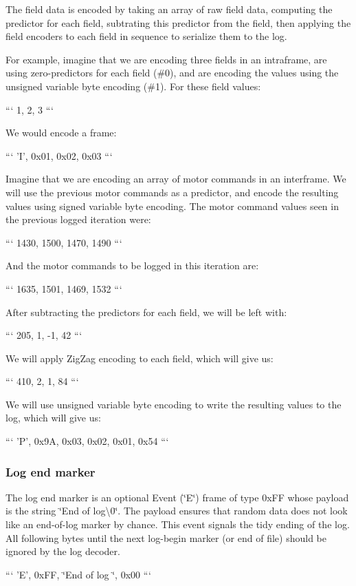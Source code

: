 The field data is encoded by taking an array of raw field data, computing the predictor for each field, subtrating this predictor from the field, then applying the field encoders to each field in sequence to serialize them to the log.

For example, imagine that we are encoding three fields in an intraframe, are using zero-\/predictors for each field (\#0), and are encoding the values using the unsigned variable byte encoding (\#1). For these field values\+:

``` 1, 2, 3 ```

We would encode a frame\+:

``` 'I', 0x01, 0x02, 0x03 ```

Imagine that we are encoding an array of motor commands in an interframe. We will use the previous motor commands as a predictor, and encode the resulting values using signed variable byte encoding. The motor command values seen in the previous logged iteration were\+:

``` 1430, 1500, 1470, 1490 ```

And the motor commands to be logged in this iteration are\+:

``` 1635, 1501, 1469, 1532 ```

After subtracting the predictors for each field, we will be left with\+:

``` 205, 1, -\/1, 42 ```

We will apply Zig\+Zag encoding to each field, which will give us\+:

``` 410, 2, 1, 84 ```

We will use unsigned variable byte encoding to write the resulting values to the log, which will give us\+:

``` 'P', 0x9\+A, 0x03, 0x02, 0x01, 0x54 ```

\subsubsection*{Log end marker}

The log end marker is an optional Event (\char`\"{}\+E\char`\"{}) frame of type 0x\+F\+F whose payload is the string \char`\"{}\+End of log\textbackslash{}0\char`\"{}. The payload ensures that random data does not look like an end-\/of-\/log marker by chance. This event signals the tidy ending of the log. All following bytes until the next log-\/begin marker (or end of file) should be ignored by the log decoder.

``` 'E', 0x\+F\+F, \char`\"{}\+End of log \char`\"{}, 0x00 ```

